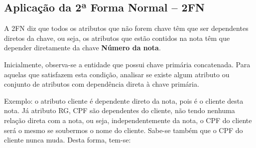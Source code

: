 \documentclass{article}
\begin{document}
\subsection*{Aplicação da 2ª Forma Normal – 2FN}
A 2FN diz que todos os atributos que não forem chave têm que ser dependentes diretos da chave, ou seja, os atributos que estão contidos na nota têm que depender diretamente da chave \textbf{Número da nota}.

Inicialmente, observa-se a entidade que possui chave primária concatenada. Para aquelas que satisfazem esta condição, analisar se existe algum atributo ou conjunto de atributos com dependência direta à chave primária.

Exemplo: o atributo cliente é dependente direto da nota, pois é o cliente desta nota. Já atributo RG, CPF são dependentes do cliente, não tendo nenhuma relação direta com a nota, ou seja, independentemente da nota, o CPF do cliente será o mesmo se soubermos o nome do cliente. Sabe-se também que o CPF do cliente nunca muda. Desta forma, tem-se:
\end{document}

